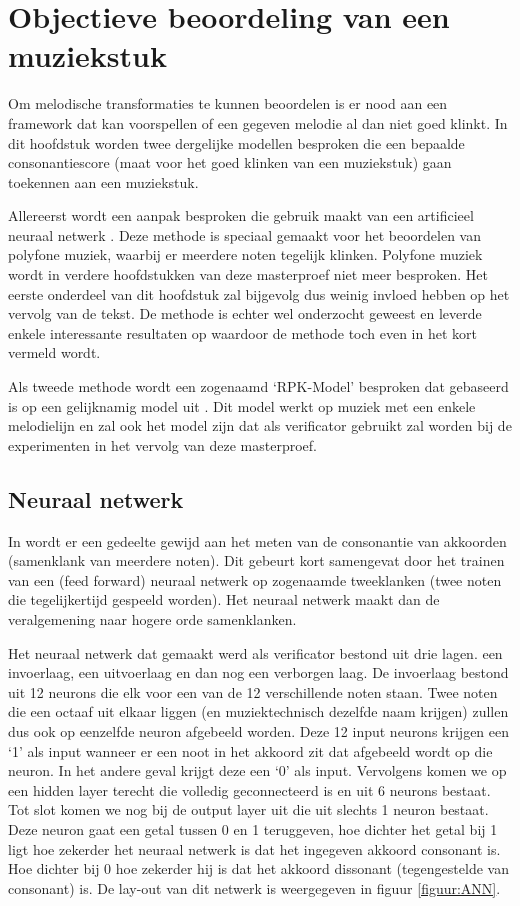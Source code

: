 \chapter{Objectieve beoordeling van een muziekstuk}
\label{hoofdstuk:OBM}
Om melodische transformaties te kunnen beoordelen is er nood aan een framework dat kan voorspellen of een gegeven melodie al dan niet goed klinkt. In dit hoofdstuk worden twee dergelijke modellen besproken die een bepaalde consonantiescore (maat voor het goed klinken van een muziekstuk) gaan toekennen aan een muziekstuk. 

Allereerst wordt een aanpak besproken die gebruik maakt van een artificieel neuraal netwerk \cite{book:ANN}. Deze methode is speciaal gemaakt voor het beoordelen van polyfone muziek, waarbij er meerdere noten tegelijk klinken. Polyfone muziek wordt in verdere hoofdstukken van deze masterproef niet meer besproken. Het eerste onderdeel van dit hoofdstuk zal bijgevolg dus weinig invloed hebben op het vervolg van de tekst. De methode is echter wel onderzocht geweest en leverde enkele interessante resultaten op waardoor de methode toch even in het kort vermeld wordt. 

Als tweede methode wordt een zogenaamd `RPK-Model' besproken dat gebaseerd is op een gelijknamig model uit \cite{book:musicAndProbability}. Dit model werkt op muziek met een enkele melodielijn en zal ook het model zijn dat als verificator gebruikt zal worden bij de experimenten in het vervolg van deze masterproef.

\section{Neuraal netwerk}
\label{OBM:NN}
In \cite{book:musimathics} wordt er een gedeelte gewijd aan het meten van de consonantie van akkoorden (samenklank van meerdere noten). Dit gebeurt kort samengevat door het trainen van een (feed forward) neuraal netwerk\cite{url:FFNN} op zogenaamde tweeklanken (twee noten die tegelijkertijd gespeeld worden). Het neuraal netwerk maakt dan de veralgemening naar hogere orde samenklanken. 

Het neuraal netwerk dat gemaakt werd als verificator bestond uit drie lagen. een invoerlaag, een uitvoerlaag en dan nog een verborgen laag. De invoerlaag bestond uit 12 neurons die elk voor een van de 12 verschillende noten staan. Twee noten die een octaaf uit elkaar liggen (en muziektechnisch dezelfde naam krijgen) zullen dus ook op eenzelfde neuron afgebeeld worden. Deze 12 input neurons krijgen een `1' als input wanneer er een noot in het akkoord zit dat afgebeeld wordt op die neuron. In het andere geval krijgt deze een `0' als input. Vervolgens komen we op een hidden layer terecht die volledig geconnecteerd is en uit 6 neurons bestaat. Tot slot komen we nog bij de output layer uit die uit slechts 1 neuron bestaat. Deze neuron gaat een getal tussen 0 en 1 teruggeven, hoe dichter het getal bij 1 ligt hoe zekerder het neuraal netwerk is dat het ingegeven akkoord consonant is. Hoe dichter bij 0 hoe zekerder hij is dat het akkoord dissonant (tegengestelde van consonant) is. De lay-out van dit netwerk is weergegeven in figuur \ref{figuur:ANN}.\\

